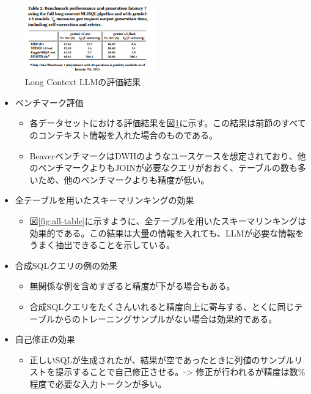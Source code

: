 \documentclass[dvipdfmx,uplatex]{jsarticle}
\theoremstyle{remark}
\newenvironment{experiment}[1]{
    \begin{tcolorbox}[
        colframe=violet,
        colback=violet!10!white,
        colbacktitle=violet!40!white,
        coltitle=black,
        fonttitle=\bfseries,
        title={#1}
    ]
}{
    \end{tcolorbox}
}
\begin{document}
\begin{figure}
    \centering
    \includegraphics[width=0.5\textwidth]{img/long-context-nl2sql/result.png}
    \caption{Long Context LLMの評価結果}
    \label{fig:full-result}
\end{figure}

\begin{experiment}{実験結果}
\begin{itemize}
    \item ベンチマーク評価
    \begin{itemize}
        \item 各データセットにおける評価結果を図\ref{fig:full-result}に示す。この結果は前節のすべてのコンテキスト情報を入れた場合のものである。
        \item BeaverベンチマークはDWHのようなユースケースを想定されており、他のベンチマークよりもJOINが必要なクエリがおおく、テーブルの数も多いため、他のベンチマークよりも精度が低い。
    \end{itemize}
    \item 全テーブルを用いたスキーマリンキングの効果
    \begin{itemize}
        \item 図\ref{fig:all-table}に示すように、全テーブルを用いたスキーマリンキングは効果的である。この結果は大量の情報を入れても、LLMが必要な情報をうまく抽出できることを示している。
    \end{itemize}
    \item 合成SQLクエリの例の効果
    \begin{itemize}
        \item 無関係な例を含めすぎると精度が下がる場合もある。
        \item 合成SQLクエリをたくさんいれると精度向上に寄与する、とくに同じテーブルからのトレーニングサンプルがない場合は効果的である。
    \end{itemize}
    \item 自己修正の効果
    \begin{itemize}
        \item 正しいSQLが生成されたが、結果が空であったときに列値のサンプルリストを提示することで自己修正させる。-> 修正が行われるが精度は数\%程度で必要な入力トークンが多い。

\end{itemize}
\end{itemize}
\end{experiment}
\end{document}

